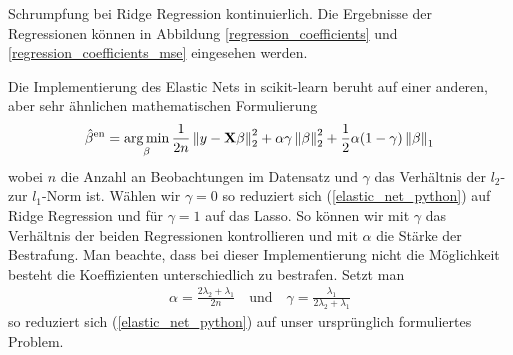 Schrumpfung bei Ridge Regression kontinuierlich.
Die Ergebnisse der Regressionen können in Abbildung \ref{regression_coefficients} und \ref{regression_coefficients_mse} eingesehen werden. 

Die Implementierung des Elastic Nets in scikit-learn \cite{scikit_learn} beruht auf einer anderen, aber sehr ähnlichen mathematischen Formulierung
\begin{align}
\label{elastic_net_python}
\hat{\beta}^{\text{en}} = \operatorname*{arg\,min}_{\beta} \frac{1}{2n} \left\lVert y - \mathbf{X} \beta \right\rVert_2^2 + \alpha \gamma \left\lVert \beta \right\rVert_{2}^{2} + \frac{1}{2}\alpha (1-\gamma) \left\lVert \beta \right\rVert_{1}
\end{align}
wobei $n$ die Anzahl an Beobachtungen im Datensatz und $\gamma$ das Verhältnis der $l_2$- zur $l_1$-Norm ist. Wählen wir $\gamma = 0$ so reduziert sich (\ref{elastic_net_python}) auf Ridge Regression und für $\gamma = 1$ auf das Lasso. So können wir mit $\gamma$ das Verhältnis der beiden Regressionen kontrollieren und mit $\alpha$ die Stärke der Bestrafung. Man beachte, dass bei dieser Implementierung nicht die Möglichkeit besteht die Koeffizienten unterschiedlich zu bestrafen.
Setzt man 
\begin{align}
 \alpha = \frac{2\lambda_2 + \lambda_1}{2n} \quad \text{und} \quad \gamma = \frac{\lambda_1}{2\lambda_2 + \lambda_1}
\end{align}
so reduziert sich (\ref{elastic_net_python}) auf unser ursprünglich formuliertes Problem.

